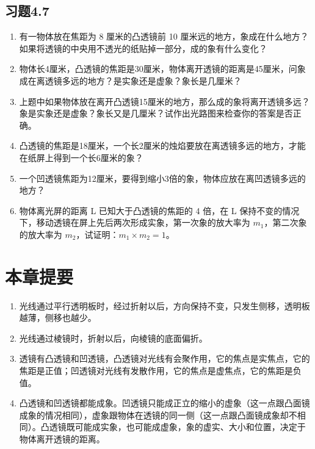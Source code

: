 \subsection{习题4.7}

\begin{enumerate}
\item
  有一物体放在焦距为 8 厘米的凸透镜前 10
  厘米远的地方，象成在什么地方？如果将透镜的中央用不透光的纸贴掉一部分，成的象有什么变化？
\item
  物体长4厘米，凸透镜的焦距是30厘米，物体离开透镜的距离是45厘米，问象成在离透镜多远的地方？是实象还是虚象？象长是几厘米？
\item
  上题中如果物体放在离开凸透镜15厘米的地方，那么成的象将离开透镜多远？象是实象还是虚象？象长又是几厘米？试作出光路图来检查你的答案是否正确。
\item
  凸透镜的焦距是18厘米，一个长2厘米的烛焰要放在离透镜多远的地方，才能在纸屏上得到一个长6厘米的象？
\item
  一个凹透镜焦距为12厘米，要得到缩小3倍的象，物体应放在离凹透镜多远的地方？
\item
  物体离光屏的距离 L 已知大于凸透镜的焦距的 4 倍，在 L
  保持不变的情况下，移动透镜在屏上先后两次形成实象，第一次象的放大率为
  \(m_{1}\)，第二次象的放大率为
  \(m_{2}\)，试证明：\(m_{1} \times m_{2} = 1\)。
\end{enumerate}

\section{本章提要}

\begin{enumerate}
\item
  光线通过平行透明板时，经过折射以后，方向保持不变，只发生侧移，透明板越薄，侧移也越少。
\item
  光线通过棱镜时，折射以后，向棱镜的底面偏折。
\item
  透镜有凸透镜和凹透镜，凸透镜对光线有会聚作用，它的焦点是实焦点，它的焦距是正值；凹透镜对光线有发散作用，它的焦点是虚焦点，它的焦距是负值。
\item
  凸透镜和凹透镜都能成象。凹透镜只能成正立的缩小的虚象（这一点跟凸面镜成象的情况相同），虚象跟物体在透镜的同一侧（这一点跟凸面镜成象却不相同）。凸透镜既可能成实象，也可能成虚象，象的虚实、大小和位置，决定于物体离开透镜的距离。
\end{enumerate}

